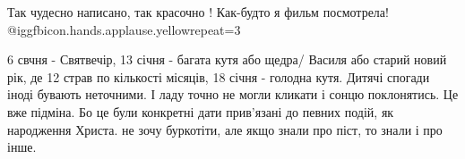 \begin{itemize}

Так чудесно написано, так красочно ! Как-будто я фильм посмотрела!
@igg{fbicon.hands.applause.yellow}{repeat=3} 


6 свчня - Святвечір, 13 січня - багата кутя або щедра/ Василя або старий новий
рік, де 12 страв по кількості місяців, 18 січня - голодна кутя. Дитячі спогади
іноді бувають неточними. І ладу точно не могли кликати і сонцю поклонятись. Це
вже підміна. Бо це були конкретні дати прив’язані до певних подій, як
народження Христа. не зочу буркотіти, але якщо знали про піст, то знали і про
інше.

\end{itemize} %
